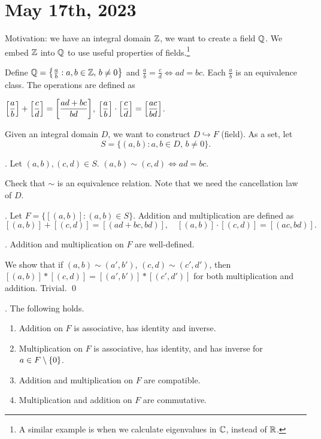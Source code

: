 \section*{May 17th, 2023}


Motivation: we have an integral domain \(\mathbb{Z}\), we want to create a field \(\mathbb{Q}\). We embed \(\mathbb{Z}\) into \(\mathbb{Q}\) to use useful properties of fields.\footnote{A similar example is when we calculate eigenvalues in \(\mathbb{C}\), instead of \(\mathbb{R}\).}

Define \(\mathbb{Q} = \left\{\frac{a}{b} : a, b \in \mathbb{Z},\, b \neq 0\right\}\) and \(\frac{a}{b} = \frac{c}{d} \iff ad = bc\). Each \(\frac{a}{b}\) is an equivalence class. The operations are defined as
\begin{center}
    \(\displaystyle \left[\frac{a}{b}\right] + \left[\frac{c}{d}\right] = \left[\frac{ad + bc}{bd}\right]\), \(\displaystyle \left[\frac{a}{b}\right] \cdot \left[\frac{c}{d}\right] = \left[\frac{ac}{bd}\right]\).
\end{center}

Given an integral domain \(D\), we want to construct \(D \hookrightarrow F\) (field). As a set, let
\[
    S = \{(a, b) : a, b\in D,\, b \neq 0\}.
\]

. Let \((a, b), (c, d) \in S\). \((a, b) \sim (c, d) \iff ad = bc\).

Check that \(\sim\) is an equivalence relation. Note that we need the cancellation law of \(D\).

. Let \(F = \{[(a, b)] : (a, b) \in S\}\). Addition and multiplication are defined as
\[
    [(a, b)] + [(c, d)] = [(ad + bc, bd)], \quad [(a, b)] \cdot [(c, d)] = [(ac, bd)].
\]

\lemma. Addition and multiplication on \(F\) are well-defined.

\pf We show that if \((a, b) \sim (a', b')\), \((c, d) \sim (c', d')\), then \([(a, b)] * [(c, d)] = [(a', b')] * [(c', d')]\) for both multiplication and addition. Trivial. \qed

\lemma. The following holds.
\begin{enumerate}
    \item Addition on \(F\) is associative, has identity and inverse.
    \item Multiplication on \(F\) is associative, has identity, and has inverse for \(a \in F \setminus \{0\}\).
    \item Addition and multiplication on \(F\) are compatible.
    \item Multiplication and addition on \(F\) are commutative.
\end{enumerate}

